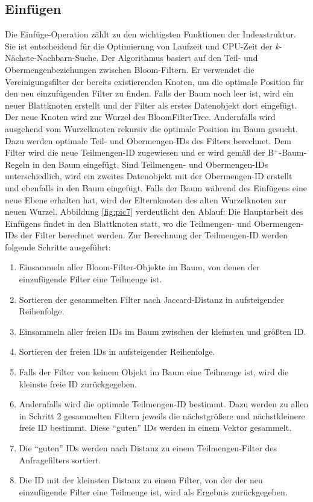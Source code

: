 \subsection{Einfügen}\label{sec:einfügen}
Die Einfüge-Operation zählt zu den wichtigsten Funktionen der Indexstruktur. Sie ist entscheidend für die Optimierung von Laufzeit und CPU-Zeit der \textit{k}-Nächste-Nachbarn-Suche. Der Algorithmus basiert auf den Teil- und Obermengenbeziehungen zwischen Bloom-Filtern. Er verwendet die Vereinigungsfilter der bereits existierenden Knoten, um die optimale Position für den neu einzufügenden Filter zu finden. Falls der Baum noch leer ist, wird ein neuer Blattknoten erstellt und der Filter als erstes Datenobjekt dort eingefügt. Der neue Knoten wird zur Wurzel des BloomFilterTree. Andernfalls wird ausgehend vom Wurzelknoten rekursiv die optimale Position im Baum gesucht. Dazu werden optimale Teil- und Obermengen-IDs des Filters berechnet. Dem Filter wird die neue Teilmengen-ID zugewiesen und er wird gemäß der B$^+$-Baum-Regeln in den Baum eingefügt. Sind Teilmengen- und Obermengen-IDs unterschiedlich, wird ein zweites Datenobjekt mit der Obermengen-ID erstellt und ebenfalls in den Baum eingefügt. Falls der Baum während des Einfügens eine neue Ebene erhalten hat, wird der Elternknoten des alten Wurzelknoten zur neuen Wurzel. Abbildung \ref{fig:pic7} verdeutlicht den Ablauf:  
Die Hauptarbeit des Einfügens findet in den Blattknoten statt, wo die Teilmengen- und Obermengen-IDs der Filter berechnet werden. Zur Berechnung der Teil\-mengen-ID werden folgende Schritte ausgeführt: 
\begin{enumerate}
	\item Einsammeln aller Bloom-Filter-Objekte im Baum, von denen der einzufügende Filter eine Teilmenge ist.
	\item Sortieren der gesammelten Filter nach Jaccard-Distanz in aufsteigender Reihenfolge.
	\item Einsammeln aller freien IDs im Baum zwischen der kleinsten und größten ID. 
	\item Sortieren der freien IDs in aufsteigender Reihenfolge.
	\item Falls der Filter von keinem Objekt im Baum eine Teilmenge ist, wird die kleinste freie ID zurückgegeben. 
	\item Andernfalls wird die optimale Teilmengen-ID bestimmt. Dazu werden zu allen in Schritt 2 gesammelten Filtern jeweils die nächstgrößere und nächstkleinere freie ID bestimmt. Diese "`guten"' IDs werden in einem Vektor gesammelt. 
	\item Die "`guten"' IDs werden nach Distanz zu einem Teilmengen-Filter des Anfragefilters sortiert. 
	\item Die ID mit der kleinsten Distanz zu einem Filter, von der der neu einzufügende Filter eine Teilmenge ist, wird als Ergebnis zurückgegeben. 
\end{enumerate}
